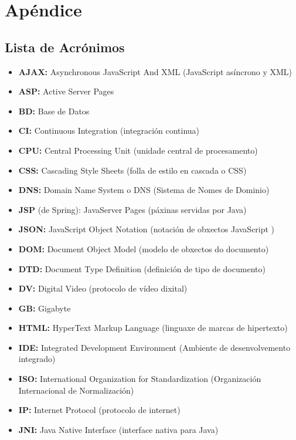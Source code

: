 \chapter{Apéndice}

\section{Lista de Acrónimos}

\begin{itemize}

    \item \textbf{AJAX:} Asynchronous JavaScript And XML (JavaScript asíncrono y XML)
    \item \textbf{ASP:} Active Server Pages
    \item \textbf{BD:} Base de Datos
    \item \textbf{CI:} Continuous Integration (integración continua)
    \item \textbf{CPU:} Central Processing Unit (unidade central de procesamento)
    \item \textbf{CSS:} Cascading Style Sheets (folla de estilo en cascada o CSS)
    \item \textbf{DNS:} Domain Name System o DNS (Sistema de Nomes de Dominio)
    \item \textbf{JSP} (de Spring): JavaServer Pages (páxinas servidas por Java)
    \item \textbf{JSON:} JavaScript Object Notation (notación de obxectos JavaScript )
    \item \textbf{DOM:} Document Object Model (modelo de obxectos do documento)
    \item \textbf{DTD:} Document Type Definition (definición de tipo de documento)
    \item \textbf{DV:} Digital Video (protocolo de vídeo dixital) 
    \item \textbf{GB:} Gigabyte
    \item \textbf{HTML:} HyperText Markup Language (linguaxe de marcas de hipertexto)
    \item \textbf{IDE:} Integrated Development Environment (Ambiente de desenvolvemento integrado)
    \item \textbf{ISO:} International Organization for Standardization (Organización Internacional de Normalización)
    \item \textbf{IP:} Internet Protocol (protocolo de internet)
    \item \textbf{JNI:} Java Native Interface (interface nativa para Java)

\end{itemize}
